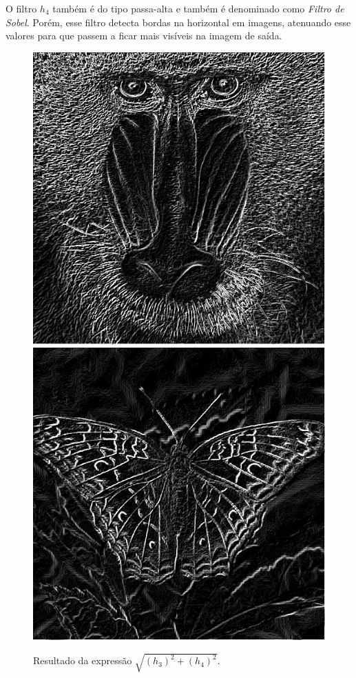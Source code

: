 \documentclass[twoside,twocolumn]{article}
\begin{document}
O filtro $h_{4}$ também é do tipo passa-alta e também é denominado como \textit{Filtro de Sobel}. Porém, esse filtro detecta bordas na horizontal em imagens, atenuando esse valores para que passem a ficar mais visíveis na imagem de saída.

\begin{figure}[H]
\begin{center}
	\includegraphics[scale=.19]{figures/baboon_h.png}
	\includegraphics[scale=.19]{figures/butterfly_h.png}
\caption{Resultado da expressão $\sqrt{(h_{3})^{2} + (h_{4})^{2}}$.} \label{gdimotes}
\end{center}
\end{figure}
\end{document}
